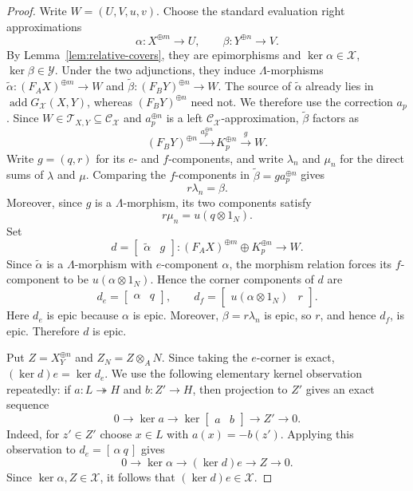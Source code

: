 \documentclass[11pt,reqno]{amsart}
\theoremstyle{definition}
\theoremstyle{remark}
\newcommand{\addc}{\operatorname{add}}
\numberwithin{equation}{section}
\begin{document}
\begin{proof}
Write $W=(U,V,u,v)$.  Choose the standard evaluation right
approximations
\[
 \alpha:X^{\oplus m}\longrightarrow U,
 \qquad
 \beta:Y^{\oplus n}\longrightarrow V.
\]
By Lemma~\ref{lem:relative-covers}, they are epimorphisms and
$\ker\alpha\in\mathcal X$, $\ker\beta\in\mathcal Y$.  Under the two
adjunctions, they induce $\Lambda$-morphisms
$\widetilde\alpha:(F_AX)^{\oplus m}\to W$ and
$\widetilde\beta:(F_BY)^{\oplus n}\to W$.  The source of
$\widetilde\alpha$ already lies in $\addc G_{\mathcal X}(X,Y)$, whereas
$(F_BY)^{\oplus n}$ need not.  We therefore use the correction $a_p$.
Since $W\in\mathcal T_{X,Y}\subseteq
\mathcal C_{\mathcal X}$ and $a_p^{\oplus n}$ is a left
$\mathcal C_{\mathcal X}$-approximation, $\widetilde\beta$ factors as
\[
 (F_BY)^{\oplus n}\xrightarrow{a_p^{\oplus n}}K_p^{\oplus n}
 \xrightarrow{g}W.
\]
Write $g=(q,r)$ for its $e$- and $f$-components, and write $\lambda_n$
and $\mu_n$ for the direct sums of $\lambda$ and $\mu$.  Comparing the
$f$-components in $\widetilde\beta=g a_p^{\oplus n}$ gives
\[
 r\lambda_n=\beta.
\]
Moreover, since $g$ is a $\Lambda$-morphism, its two components satisfy
\[
 r\mu_n=u(q\otimes1_N).
\]
Set
\[
d=\begin{bmatrix}\widetilde\alpha&g\end{bmatrix}:
 (F_AX)^{\oplus m}\oplus K_p^{\oplus n}\longrightarrow W.
\]
Since $\widetilde\alpha$ is a $\Lambda$-morphism with $e$-component
$\alpha$, the morphism relation forces its $f$-component to be
$u(\alpha\otimes1_N)$.  Hence the corner components of $d$ are
\[
 d_e=\begin{bmatrix}\alpha&q\end{bmatrix},
 \qquad
 d_f=\begin{bmatrix}u(\alpha\otimes1_N)&r\end{bmatrix}.
\]
Here $d_e$ is epic because $\alpha$ is epic.  Moreover,
$\beta=r\lambda_n$ is epic, so $r$, and hence $d_f$, is epic.  Therefore
$d$ is epic.

Put $Z=X_Y^{\oplus n}$ and $Z_N=Z\otimes_AN$.  Since taking the
$e$-corner is exact, $(\ker d)e=\ker d_e$.
We use the following elementary kernel observation repeatedly: if
$a:L\twoheadrightarrow H$ and $b:Z'\to H$, then projection to $Z'$ gives
an exact sequence
\[
 0\longrightarrow\ker a\longrightarrow
 \ker\begin{bmatrix}a&b\end{bmatrix}
 \longrightarrow Z'\longrightarrow0.
\]
Indeed, for $z'\in Z'$ choose $x\in L$ with $a(x)=-b(z')$.
Applying this observation to $d_e=[\,\alpha\ q\,]$ gives
\[
 0\longrightarrow\ker\alpha\longrightarrow(\ker d)e
 \longrightarrow Z\longrightarrow0.
\]
Since $\ker\alpha,Z\in\mathcal X$, it follows that
$(\ker d)e\in\mathcal X$.


\end{proof}
\end{document}
